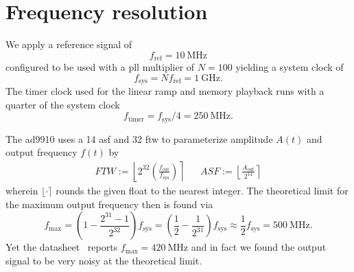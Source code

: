\section{Frequency resolution}

We apply a reference signal of
\begin{equation}
  f_\text{ref}=\SI{10}{\mega\hertz}
\end{equation}
configured to be used with a \gls{pll} multiplier of
$N=100$ yielding a system clock of
\begin{equation}
  f_\text{sys}=Nf_\text{ref}=\SI{1}{\giga\hertz}.
\end{equation}
The timer clock used for the linear ramp and memory playback runs with
a quarter of the system clock
\begin{equation}
  f_\text{timer}=f_\text{sys}/4=\SI{250}{\mega\hertz}.
\end{equation}

The \gls{ad9910} uses a \SI{14}{\bit} \gls{asf} and \SI{32}{\bit} \gls{ftw}
to parameterize amplitude $A(t)$ and output frequency $f(t)$ by
\begin{align}
  FTW
  :=
  \left\lfloor2^{32}\left(\frac{f_\text{out}}{f_\text{sys}}\right)\right\rceil
  &&
  ASF
  :=
  \left\lfloor\frac{A_\text{out}}{2^{14}}\right\rceil
  \label{eq:elec:ftwasf}
\end{align}
wherein $\lfloor{\cdot}\rceil$ rounds the given float to the nearest integer.
The theoretical limit for the maximum output frequency then is found via
\begin{equation*}
  f_\text{max}
  =
  \left(1-\frac{2^{31}-1}{2^{32}}\right)f_\text{sys}
  =
  \left(\frac{1}{2}-\frac{1}{2^{31}}\right)f_\text{sys}
  \approx
  \frac{1}{2}f_\text{sys}
  =
  \SI{500}{\mega\hertz}.
\end{equation*}
Yet the datasheet~\cite{AD9910} reports $f_\text{max}=\SI{420}{\mega\hertz}$
and in fact we found the output signal to be very noisy at the theoretical
limit.

